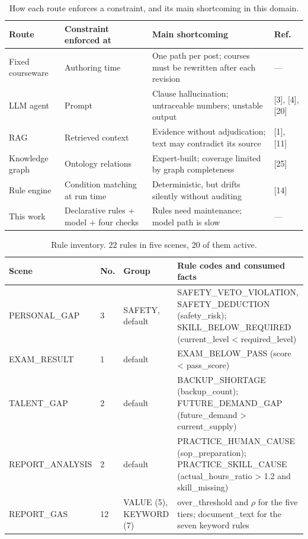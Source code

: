\documentclass[conference]{IEEEtran}
\begin{document}
\begin{table}[t]
\caption{How each route enforces a constraint, and its main shortcoming in this domain.}
\centering
\footnotesize
\begin{tabular}{@{}p{}p{}p{}p{}@{}}
\hline
\textbf{Route} & \textbf{Constraint enforced at} & \textbf{Main shortcoming} & \textbf{Ref.} \\ \hline
Fixed courseware & Authoring time & One path per post; courses must be rewritten after each revision & --- \\
LLM agent & Prompt & Clause hallucination; untraceable numbers; unstable output & [3], [4], [20] \\
RAG & Retrieved context & Evidence without adjudication; text may contradict its source & [1], [11] \\
Knowledge graph & Ontology relations & Expert-built; coverage limited by graph completeness & [25] \\
Rule engine & Condition matching at run time & Deterministic, but drifts silently without auditing & [14] \\
This work & Declarative rules + model + four checks & Rules need maintenance; model path is slow & --- \\
\hline
\end{tabular}
\end{table}

\begin{table}[t]
\caption{Rule inventory. 22 rules in five scenes, 20 of them active.}
\centering
\footnotesize
\begin{tabular}{@{}p{}p{}p{}p{}@{}}
\hline
\textbf{Scene} & \textbf{No.} & \textbf{Group} & \textbf{Rule codes and consumed facts} \\ \hline
PERSONAL\_GAP & 3 & SAFETY, default & SAFETY\_VETO\_VIOLATION, SAFETY\_DEDUCTION (safety\_risk); SKILL\_BELOW\_REQUIRED (current\_level < required\_level) \\
EXAM\_RESULT & 1 & default & EXAM\_BELOW\_PASS (score < pass\_score) \\
TALENT\_GAP & 2 & default & BACKUP\_SHORTAGE (backup\_count); FUTURE\_DEMAND\_GAP (future\_demand > current\_supply) \\
REPORT\_ANALYSIS & 2 & default & PRACTICE\_HUMAN\_CAUSE (sop\_preparation); PRACTICE\_SKILL\_CAUSE (actual\_hours\_ratio > 1.2 and skill\_missing) \\
REPORT\_GAS & 12 & VALUE (5), KEYWORD (7) & over\_threshold and $\rho$ for the five tiers; document\_text for the seven keyword rules \\
\hline
\end{tabular}
\end{table}
\end{document}
